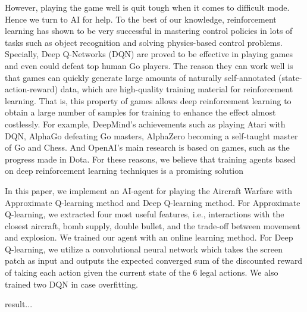 \documentclass{article}
\begin{document}
\par However, playing the game well is quit tough when it comes to difficult mode. Hence we turn to AI for help. To the best of our knowledge, reinforcement learning has shown to be very successful in mastering control policies in lots of tasks such as object recognition and solving physics-based control problems\cite{}. Specially, Deep Q-Networks (DQN) are proved to be effective in playing games and even could defeat top human Go players\cite{}. The reason they can work well is that games can quickly generate large amounts of naturally self-annotated (state-action-reward) data, which are high-quality training material for reinforcement learning. That is, this property of games allows deep reinforcement learning to obtain a large number of samples for training to enhance the effect almost costlessly. For example, DeepMind's achievements such as playing Atari with DQN, AlphaGo defeating Go masters, AlphaZero becoming a self-taught master of Go and Chess. And OpenAI's main research is based on games, such as the progress made in Dota. For these reasons, we believe that training agents based on deep reinforcement learning techniques is a promising solution

\par In this paper, we implement an AI-agent for playing the Aircraft Warfare with Approximate Q-learning method and Deep Q-learning method. For Approximate Q-learning, we extracted four most useful features, i.e., interactions with the closest aircraft, bomb supply, double bullet, and the trade-off between movement and explosion. We trained our agent with an online learning method. For Deep Q-learning, we utilize a convolutional neural network which takes the screen patch as input and outputs the expected converged sum of the discounted reward of taking each action given the current state of the 6 legal actions. We also trained two DQN in case overfitting. 

\par result...


\end{document}
